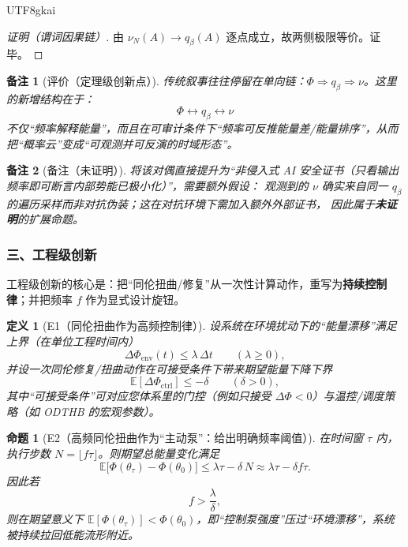 \documentclass[12pt]{article}
\newtheorem{definition}{定义}[section]
\newtheorem{proposition}{命题}[section]
\newtheorem{remark}{备注}[section]
\begin{document}
\begin{CJK*}{UTF8}{gkai}
\begin{proof}[证明（谓词因果链）]
由 $\nu_N(A)\to q_\beta(A)$ 逐点成立，故两侧极限等价。证毕。
\end{proof}

\begin{remark}[评价（定理级创新点）]
\label{rem:tex27-ch23-theorem-eval}
传统叙事往往停留在单向链：$\Phi\Rightarrow q_\beta\Rightarrow \nu$。这里的新增结构在于：
\[
  \boxed{\Phi \leftrightarrow q_\beta \leftrightarrow \nu}
\]
不仅“频率解释能量”，而且在可审计条件下“频率可反推能量差/能量排序”，从而把“概率云”变成“可观测并可反演的时域形态”。
\end{remark}

\begin{remark}[备注（未证明）]
\label{rem:tex27-ch23-theorem-unproved}
将该对偶直接提升为“非侵入式 AI 安全证书（只看输出频率即可断言内部势能已极小化）”，需要额外假设：
观测到的 $\nu$ 确实来自同一 $q_\beta$ 的遍历采样而非对抗伪装；这在对抗环境下需加入额外外部证书，
因此属于\textbf{未证明}的扩展命题。
\end{remark}

\subsubsection{三、工程级创新}
\label{subsubsec:tex27-ch23-engineering}

工程级创新的核心是：把“同伦扭曲/修复”从一次性计算动作，重写为\textbf{持续控制律}；并把频率 $f$ 作为显式设计旋钮。

\begin{definition}[E1（同伦扭曲作为高频控制律）]
\label{def:tex27-ch23-e1}
设系统在环境扰动下的“能量漂移”满足上界（在单位工程时间内）
\[
  \Delta\Phi_{\mathrm{env}}(t)\le \lambda\,\Delta t
  \qquad
  (\lambda\ge 0),
\]
并设一次同伦修复/扭曲动作在可接受条件下带来期望能量下降下界
\[
  \mathbb{E}[\Delta\Phi_{\mathrm{ctrl}}]\le -\delta
  \qquad
  (\delta>0),
\]
其中“可接受条件”可对应您体系里的门控（例如只接受 $\Delta\Phi<0$）与温控/调度策略（如 ODTHB 的宏观参数）。
\end{definition}

\begin{proposition}[E2（高频同伦扭曲作为“主动泵”：给出明确频率阈值）]
\label{prop:tex27-ch23-e2}
在时间窗 $\tau$ 内，执行步数 $N=\lfloor f\tau\rfloor$。则期望总能量变化满足
\[
  \mathbb{E}\bigl[\Phi(\theta_{\tau})-\Phi(\theta_0)\bigr]
  \le
  \lambda\tau - \delta\,N
  \approx
  \lambda\tau-\delta f\tau.
\]
因此若
\[
  f>\frac{\lambda}{\delta},
\]
则在期望意义下 $\mathbb{E}[\Phi(\theta_\tau)]<\Phi(\theta_0)$，即“控制泵强度”压过“环境漂移”，系统被持续拉回低能流形附近。
\end{proposition}


\end{CJK*}
\end{document}
